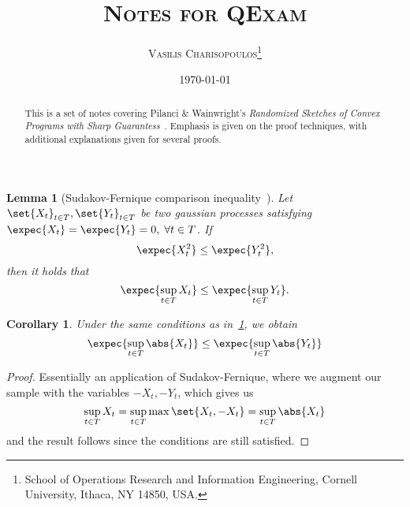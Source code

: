 \documentclass[a4paper]{article}
\newtheorem{lemma}{Lemma}
\newtheorem{corollary}{Corollary}
\begin{document}
\title{\textsc{
	Notes for QExam}}
\author{
    \textsc{Vasilis Charisopoulos}\thanks{\quad
        School of Operations Research and Information Engineering, Cornell University,
        Ithaca, NY 14850, USA.
   }}
\date{\today}
\maketitle

\begin{abstract}
This is a set of notes covering Pilanci \& Wainwright's \textit{Randomized
Sketches of Convex Programs with Sharp Guarantess}~\cite{PilWain15}. Emphasis
is given on the proof techniques, with additional explanations given for
several proofs.
\end{abstract}

\begin{lemma}[Sudakov-Fernique comparison inequality~\cite{Versh18}]
    \label{lemma:sudakov_fernique}
    Let $\set{X_{t}}_{t \in T}, \set{Y_t}_{t \in T}$ be two gaussian processes
    satisfying $\expec{X_t} = \expec{Y_t} = 0, \; \forall t \in T$. If
    \[
        \expec{X_t^2} \leq \expec{Y_t^2},
    \]
    then it holds that
    \[
        \expec{\sup_{t \in T} X_t} \leq \expec{\sup_{t \in T} Y_t}.
    \]
\end{lemma}
\begin{corollary}
    \label{corl:sudakov_fernique_abs}
    Under the same conditions as in~\cref{lemma:sudakov_fernique}, we obtain
    \[
        \expec{\sup_{t \in T} \abs{X_t}} \leq \expec{\sup_{t \in T} \abs{Y_t}}
    \]
\end{corollary}
\begin{proof}
    Essentially an application of Sudakov-Fernique, where we augment our
    sample with the variables $-X_t, -Y_t$, which gives us
    \[
        \sup_{t \in T} X_t = \sup_{t \in T} \max \set{X_t, -X_t}
        = \sup_{t \in T} \abs{X_t}
    \]
    and the result follows since the conditions are still satisfied.
\end{proof}
\end{document}
